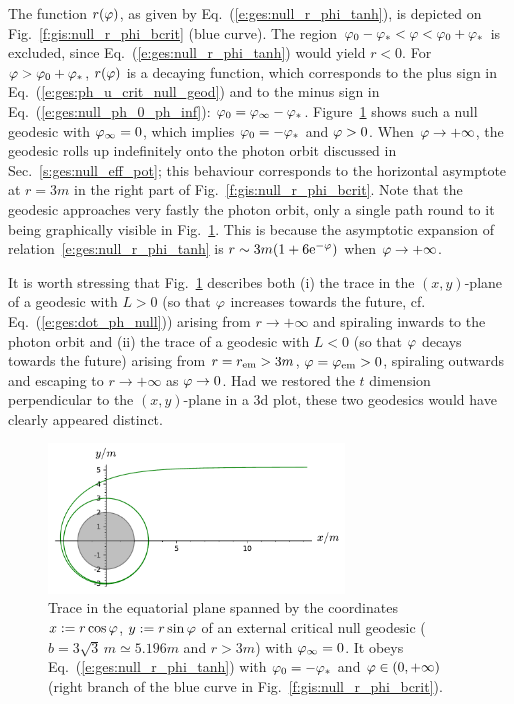 The function $r(\varphi)$, as given by Eq.~(\ref{e:ges:null_r_phi_tanh}), is
depicted on Fig.~\ref{f:gis:null_r_phi_bcrit} (blue curve).
The region $\varphi_0-\varphi_* < \varphi < \varphi_0 + \varphi_*$ is excluded, since
Eq.~(\ref{e:ges:null_r_phi_tanh}) would yield $r<0$. For $\varphi > \varphi_0 + \varphi_*$,
$r(\varphi)$ is a decaying
function, which corresponds to the
plus sign in Eq.~(\ref{e:ges:ph_u_crit_null_geod}) and to the minus sign in
Eq.~(\ref{e:ges:null_ph_0_ph_inf}): $\varphi_0 = \varphi_\infty - \varphi_*$.
Figure~\ref{f:gis:null_b_crit_from_inf_L_pos} shows such a null geodesic with
$\varphi_\infty=0$, which implies $\varphi_0 = - \varphi_*$ and $\varphi>0$.
When $\varphi\to +\infty$, the geodesic rolls up indefinitely onto the photon
orbit discussed in Sec.~\ref{s:ges:null_eff_pot}; this
behaviour corresponds to the horizontal asymptote at $r=3m$ in
the right part of Fig.~\ref{f:gis:null_r_phi_bcrit}.
Note that the geodesic approaches very fastly the photon orbit, only a single
path round to it being graphically visible in Fig.~\ref{f:gis:null_b_crit_from_inf_L_pos}.
This is because the asymptotic expansion of relation~\eqref{e:ges:null_r_phi_tanh} is
$r\sim 3m(1+ 6\mathrm{e}^{-\varphi})$ when $\varphi\to+\infty$.

It is worth stressing that Fig.~\ref{f:gis:null_b_crit_from_inf_L_pos} describes both (i) the trace
in the $(x,y)$-plane of a
geodesic with $L>0$ (so that $\varphi$ increases towards the future, cf. Eq.~(\ref{e:ges:dot_ph_null})) arising from $r\to + \infty$
and spiraling inwards to the photon orbit
and (ii) the trace of a geodesic with $L<0$ (so that $\varphi$ decays towards the future)
arising from $r=r_{\rm em} > 3 m$, $\varphi=\varphi_{\rm em}>0$,
spiraling outwards and escaping to $r\to +\infty$ as $\varphi\to 0$. Had we restored the
$t$ dimension perpendicular to the $(x,y)$-plane in a 3d plot, these two geodesics would have
clearly appeared distinct.

\begin{figure}
\centerline{\includegraphics[width=0.7\textwidth]{ges_null_b_crit_from_inf_L_pos.pdf}}
\caption[]{\label{f:gis:null_b_crit_from_inf_L_pos} \footnotesize
Trace in the equatorial plane spanned by the coordinates $x:=r\cos\varphi$, $y:=r\sin\varphi$
of an external critical null geodesic ($b = 3\sqrt{3} \, m \simeq 5.196 m$ and
$r>3m$) with $\varphi_\infty=0$.
It obeys Eq.~(\ref{e:ges:null_r_phi_tanh}) with $\varphi_0 = -\varphi_*$ and $\varphi\in(0,+\infty)$
(right branch of the blue curve in Fig.~\ref{f:gis:null_r_phi_bcrit}).}
\end{figure}


